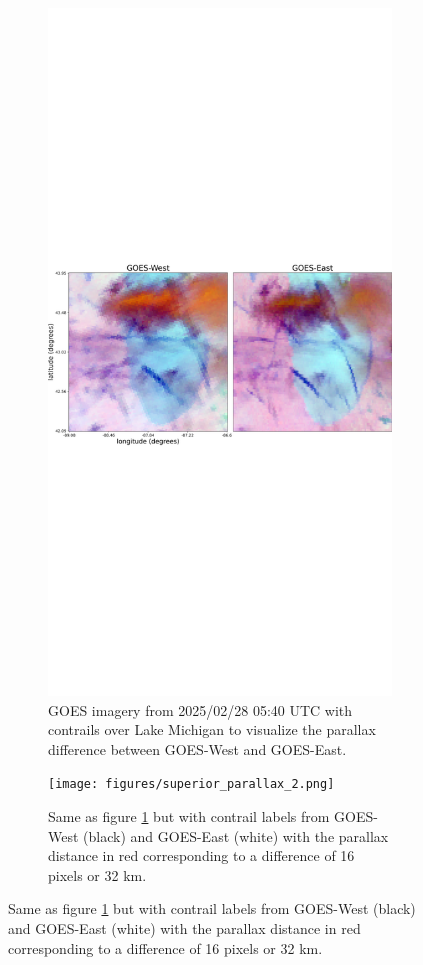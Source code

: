 \begin{figure}
\begin{subfigure}[t]{.49\linewidth}
  \centering
    \includegraphics[width=\textwidth]{figures/superior_parallax.png}
    \caption{GOES imagery from 2025/02/28 05:40 UTC with contrails over Lake Michigan to visualize the parallax difference between GOES-West and GOES-East.}
  \label{parallax1}
\end{subfigure}
\hspace{.01cm}
\begin{subfigure}[t]{.49\linewidth}
  \centering
    \texttt{[image: figures/superior\_parallax\_2.png]}
    \caption{Same as figure \ref{parallax1} but with contrail labels from GOES-West (black) and GOES-East (white) with the parallax distance in red corresponding to a difference of 16 pixels or 32 km.}
  \label{parallax2}
\end{subfigure}


\end{figure}
